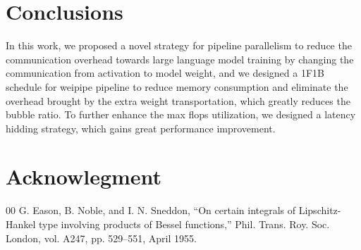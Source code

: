 \documentclass[sigplan,screen]{acmart}
\begin{document}
\section{Conclusions}
In this work, we proposed a novel strategy for pipeline parallelism to reduce the communication overhead towards large language model training by changing the communication from activation to model weight, and we designed a 1F1B schedule for weipipe pipeline to reduce memory consumption and eliminate the overhead brought by the extra weight transportation, which greatly reduces the bubble ratio. To further enhance the max flops utilization, we designed a latency hidding strategy, which gains great performance improvement.

\section{Acknowlegment}

\begin{thebibliography}{00}
 G. Eason, B. Noble, and I. N. Sneddon, ``On certain integrals of Lipschitz-Hankel type involving products of Bessel functions,'' Phil. Trans. Roy. Soc. London, vol. A247, pp. 529--551, April 1955.
\end{thebibliography}
\end{document}
